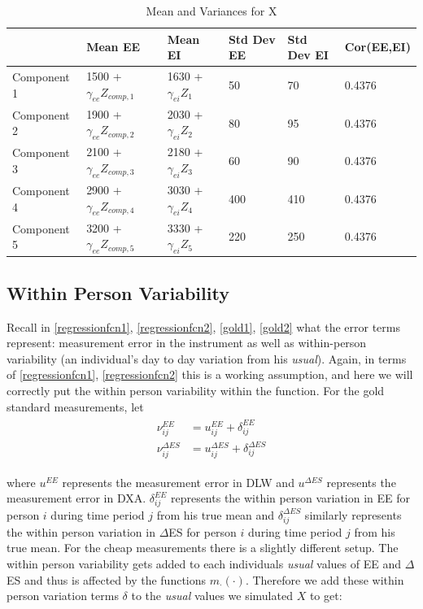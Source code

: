 \documentclass[11pt]{article}\usepackage[]{graphicx}\usepackage[]{color}
\begin{document}
\begin{table}
  \begin{tabular}{l|lllll}
    \hline
    & Mean EE & Mean EI & Std Dev EE & Std Dev EI & Cor(EE,EI) \\
    \hline
    Component 1 & 1500 + $\gamma_{ee} Z_{comp,1}$ & 1630 + $\gamma_{ei} Z_1$ & 50 & 70 & 0.4376\\
    Component 2 & 1900 + $\gamma_{ee} Z_{comp,2}$ & 2030 + $\gamma_{ei} Z_2$ & 80 & 95 & 0.4376\\
    Component 3 & 2100 + $\gamma_{ee} Z_{comp,3}$ & 2180 + $\gamma_{ei} Z_3$ & 60 & 90 & 0.4376\\
    Component 4 & 2900 + $\gamma_{ee} Z_{comp,4}$ & 3030 + $\gamma_{ei} Z_4$ & 400 & 410 & 0.4376\\
    Component 5 & 3200 + $\gamma_{ee} Z_{comp,5}$ & 3330 + $\gamma_{ei} Z_5$ & 220 & 250 & 0.4376\\
    \hline
   \end{tabular}
\caption{Mean and Variances for X}
\label{xparams}
\end{table}
 

\subsection{Within Person Variability}

Recall in \eqref{regressionfcn1}, \eqref{regressionfcn2}, \eqref{gold1}, \eqref{gold2} what the error terms represent: measurement error in the instrument as well as within-person variability (an individual's day to day variation from his \emph{usual}). Again, in terms of \eqref{regressionfcn1}, \eqref{regressionfcn2} this is a working assumption, and here we will correctly put the within person variability within the function. For the gold standard measurements, let 
\begin{align}
\begin{split}
\label{wpw}
\nu_{ij}^{EE} &= u_{ij}^{EE} + \delta_{ij}^{EE} \\
\nu_{ij}^{\Delta ES} &= u_{ij}^{\Delta ES} + \delta_{ij}^{\Delta ES}
\end{split}
\end{align}

where $u^{EE}$ represents the measurement error in DLW and $u^{\Delta ES}$ represents the measurement error in DXA. $\delta_{ij}^{EE}$ represents the within person variation in EE for person $i$ during time period $j$ from his true mean and  $\delta_{ij}^{\Delta ES}$ similarly represents the within person variation in $\Delta$ES for person $i$ during time period $j$ from his true mean. For the cheap measurements there is a slightly different setup. The within person variability gets added to each individuals \emph{usual} values of EE and $\Delta$ES and thus is affected by the functions $m_{\cdot}(\cdot)$. Therefore we add these within person variation terms $\delta$ to the \emph{usual} values we simulated $X$ to get:
\end{document}
